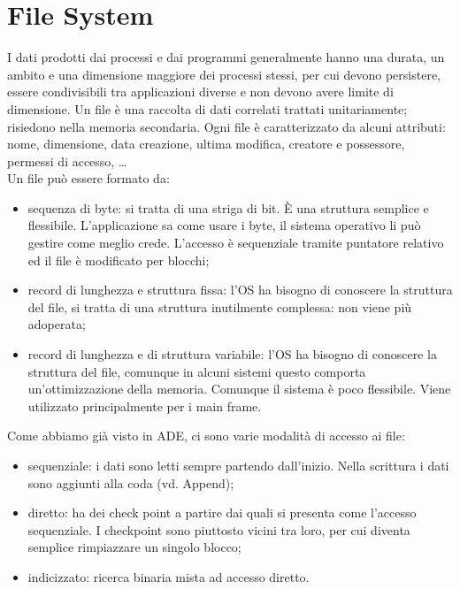 \documentclass{article}
\begin{document}
\section{File System}
I dati prodotti dai processi e dai programmi generalmente hanno una durata, un ambito e una dimensione maggiore dei processi stessi, per cui devono persistere, essere condivisibili tra applicazioni diverse e non devono avere limite di dimensione.
Un file è una raccolta di dati correlati trattati unitariamente; risiedono nella memoria secondaria. Ogni file è caratterizzato da alcuni attributi: nome, dimensione, data creazione, ultima modifica, creatore e possessore, permessi di accesso, \dots\\
Un file può essere formato da:
\begin{itemize}
	\item sequenza di byte: si tratta di una striga di bit. È una struttura semplice e flessibile. L'applicazione sa come usare i byte, il sistema operativo li può gestire come meglio crede. L'accesso è sequenziale tramite puntatore relativo ed il file è modificato per blocchi;

	\item record di lunghezza e struttura fissa: l'OS ha bisogno di conoscere la struttura del file, si tratta di una struttura inutilmente complessa: non viene più adoperata;

	\item record di lunghezza e di struttura variabile: l'OS ha bisogno di conoscere la struttura del file, comunque in alcuni sistemi questo comporta un'ottimizzazione della memoria. Comunque il sistema è poco flessibile. Viene utilizzato principalmente per i main frame.
\end{itemize}

Come abbiamo già visto in ADE, ci sono varie modalità di accesso ai file:
\begin{itemize}
	\item sequenziale: i dati sono letti sempre partendo dall'inizio. Nella scrittura i dati sono aggiunti alla coda (vd. Append);

	\item diretto: ha dei check point a partire dai quali si presenta come l'accesso sequenziale. I checkpoint sono piuttosto vicini tra loro, per cui diventa semplice rimpiazzare un singolo blocco;

	\item indicizzato: ricerca binaria mista ad accesso diretto.
\end{itemize}
\end{document}
